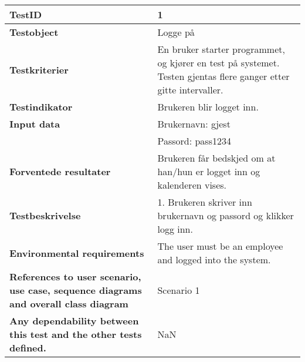 
\begin{table}
    \centering
	\begin{tabularx}{1.2\textwidth}{| p{5cm} | X |}
	\hline
	\textbf{TestID} 																& 1\\ \hline
	\textbf{Testobject} 															& Logge på\\ \hline
	\textbf{Testkriterier} 															& En bruker starter programmet, og kjører en test på systemet.
																			Testen gjentas flere ganger etter gitte intervaller.\\ \hline
	\textbf{Testindikator} 															& Brukeren blir logget inn.\\ \hline
	\textbf{Input data} 															& Brukernavn: gjest\\ 
																			& Passord: pass1234\\  \hline
	\textbf{Forventede resultater}									 				& Brukeren får bedskjed om at han/hun er logget inn og kalenderen vises.\\ \hline
	\textbf{Testbeskrivelse} 														& 1. Brukeren skriver inn brukernavn og passord og klikker logg inn.\\ \hline
	\textbf{Environmental requirements} 												& The user must be an employee and logged into the system.\\ \hline
	\textbf{References to user scenario, use case, sequence diagrams and overall class diagram} 		& Scenario 1\\ \hline
	\textbf{Any dependability between this test and the other tests defined.}		 				& NaN\\ \hline
	\end{tabularx}
\end{table}
